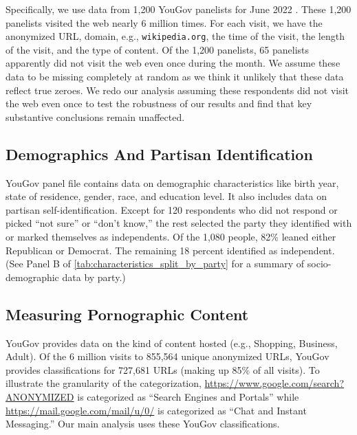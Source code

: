 \documentclass[12pt,twoside]{article}
\begin{document}
Specifically, we use data from 1,200 YouGov panelists for June 2022 \citep{data-dataverse}. These 1,200 panelists visited the web nearly 6 million times. For each visit, we have the anonymized URL, domain, e.g., \texttt{wikipedia.org}, the time of the visit, the length of the visit, and the type of content. Of the 1,200 panelists, 65 panelists apparently did not visit the web even once during the month. We assume these data to be missing completely at random as we think it unlikely that these data reflect true zeroes. We redo our analysis assuming these respondents did not visit the web even once to test the robustness of our results and find that key substantive conclusions remain unaffected.

\subsection{Demographics And Partisan Identification}
\label{subsec:demographics}
YouGov panel file contains data on demographic characteristics like birth year, state of residence, gender, race, and education level. It also includes data on partisan self-identification. Except for 120 respondents who did not respond or picked ``not sure'' or ``don't know,'' the rest selected the party they identified with or marked themselves as independents. Of the 1,080 people, 82\% leaned either Republican or Democrat. The remaining 18 percent identified as independent. (See Panel B of \cref{tab:characteristics_split_by_party} for a summary of socio-demographic data by party.)

\subsection{Measuring Pornographic Content}
\label{subsec:measuring_porn_content}

YouGov provides data on the kind of content hosted (e.g., Shopping, Business, Adult). 
Of the 6 million visits to 855,564 unique anonymized URLs, YouGov provides classifications for 727,681 URLs (making up 85\% of all visits). To illustrate the granularity of the categorization, \url{https://www.google.com/search?ANONYMIZED} is categorized as ``Search Engines and Portals'' while \url{https://mail.google.com/mail/u/0/} is categorized as ``Chat and Instant Messaging.'' Our main analysis uses these YouGov classifications.
\end{document}
